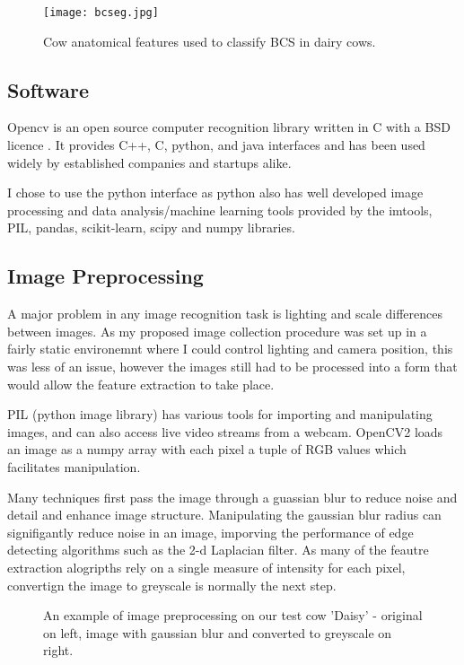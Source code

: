 \documentclass[11pt]{article}
\begin{document}
	\begin{figure}[h!]
		\centering
		\texttt{[image: bcseg.jpg]}
		\caption{Cow anatomical features used to classify BCS in dairy cows. \cite{Elanco}}
		\label{fig:<+label+>}
	\end{figure}


\subsection{Software}
	Opencv is an open source computer recognition library written in C with a BSD licence \cite{opencv_library}.
	It provides C++, C, python, and java interfaces and has been used widely by established companies and startups alike.


	I chose to use the python interface as python also has well developed image processing and data analysis/machine learning tools provided by the imtools, PIL, pandas, scikit-learn, scipy and numpy libraries.

\subsection{Image Preprocessing}
	A major problem in any image recognition task is lighting and scale differences between images.
	As my proposed image collection procedure was set up in a fairly static environemnt where I could control lighting and camera position, this was less of an issue, however the images still had to be processed into a form that would allow the feature extraction to take place.


	PIL (python image library) has various tools for importing and manipulating images, and can also access live video streams from a webcam.
	OpenCV2 loads an image as a numpy array with each pixel a tuple of RGB values which facilitates manipulation.


	Many techniques first pass the image through a guassian blur to reduce noise and detail and enhance image structure. 
	Manipulating the gaussian blur radius can signifigantly reduce noise in an image, imporving the performance of edge detecting algorithms such as the 2-d Laplacian filter.
	As many of the feautre extraction alogripths rely on a single measure of intensity for each pixel, convertign the image to greyscale is normally the next step.

	\begin{figure}[h!]
		\centering
		\begin{subfigure}
			\texttt{[image: blurcowgrey.jpg]}
		\end{subfigure}
		\begin{subfigure}
			\texttt{[image: daisy.png]}
		\end{subfigure}
		\caption{An example of image preprocessing on our test cow 'Daisy' - original on left, image with gaussian blur and converted to greyscale on right.}
	\end{figure}
\end{document}
